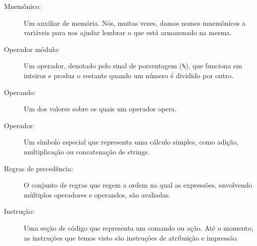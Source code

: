 {{{{{{{{{{{{{{{{{\begin{description}
\item[Mnemônico:] Um auxiliar de memória. Nós, muitas vezes, damos nomes mnemônicos a variáveis 
para nos ajudar lembrar o que está armazenado na mesma.

\item[Operador módulo:] Um operador, denotado pelo sinal de porcentagem 
({\tt \%}), que funciona em inteiros e produz o restante quando um 
número é dividido por outro.

\item[Operando:] Um dos valores sobre os quais um operador opera.

\item[Operador:] Um símbolo especial que representa uma cálculo simples, 
como adição, multiplicação ou concatenação de strings.

\item[Regras de precedência:] O conjunto de regras que regem a ordem na qual as
expressões, envolvendo múltiplos operadores e operandos, são avaliadas.

\item[Instrução:] Uma seção de código que representa um comando ou ação. Até 
o momento, as instruções que temos visto são instruções de atribuição e impressão.


\end{description}}}}}}}}}}}}}}}}}}
